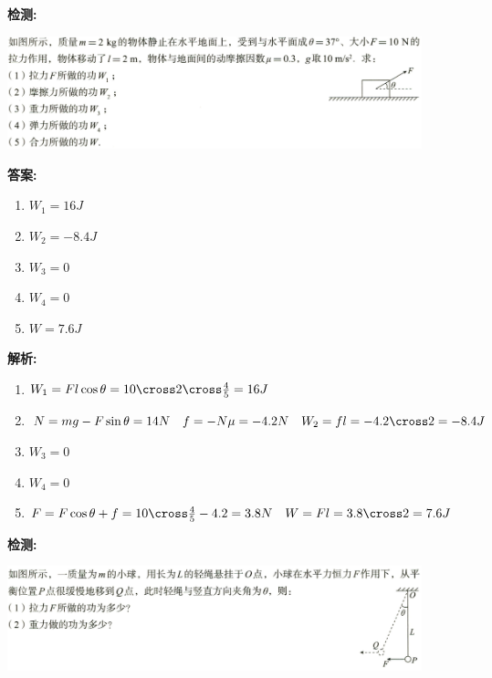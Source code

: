 \documentclass{article}
\begin{document}
\begin{itemize}
\begin{enumerate}
                  \vspace{1em}

                  \textbf{检测:}

                  \includegraphics[width=0.9\textwidth]{pictures/1.png}

                  \vspace{1em}

                  \textbf{答案:}
                  \begin{enumerate}[label=(\arabic*)]
                      \item $W_{1} = 16 J$
                      \item $W_{2} = -8.4J$
                      \item $W_{3} = 0$
                      \item $W_{4} = 0$
                      \item $W = 7.6J$
                  \end{enumerate}

                  \textbf{解析:}
                  \begin{enumerate}[label=(\arabic*)]
                      \item $W_{1} = Fl\cos{\theta} = 10 \cross 2 \cross \frac{4}{5} = 16 J$
                      \item $N = mg - F\sin{\theta} = 14 N \quad f = - N \mu = -4.2N \quad W_{2} = fl = -4.2 \cross 2 = -8.4J$
                      \item $W_{3} = 0$
                      \item $W_{4} = 0$
                      \item $F = F\cos{\theta} + f = 10 \cross \frac{4}{5} - 4.2 = 3.8N \quad W = Fl = 3.8 \cross 2 = 7.6J$
                  \end{enumerate}

                  \vspace{2em}

                  \textbf{检测:}

                  \includegraphics[width=0.9\textwidth]{pictures/2.png}


\end{enumerate}
\end{itemize}
\end{document}
